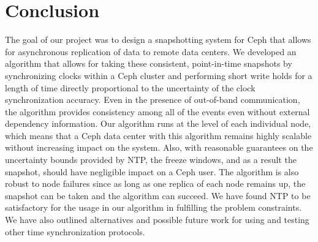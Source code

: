 \chapter{Conclusion}
\label{sec:conclusion}

The goal of our project was to design a snapshotting system for Ceph
that allows for asynchronous replication of data to remote data
centers.  We developed an algorithm that allows for taking these
consistent, point-in-time snapshots by synchronizing clocks within a
Ceph cluster and performing short write holds for a length of time
directly proportional to the uncertainty of the clock synchronization
accuracy.  Even in the presence of out-of-band communication, the
algorithm provides consistency among all of the events even without
external dependency information. Our algorithm runs at the level of
each individual node, which means that a Ceph data center with this
algorithm remains highly scalable without increasing impact on the
system. Also, with reasonable guarantees on the uncertainty bounds
provided by NTP, the freeze windows, and as a result the snapshot,
should have negligible impact on a Ceph user. The algorithm is also
robust to node failures since as long as one replica of each node
remains up, the snapshot can be taken and the algorithm can
succeed. We have found NTP to be satisfactory for the usage in our
algorithm in fulfilling the problem constraints. We have also outlined
alternatives and possible future work for using and testing other time
synchronization protocols.
